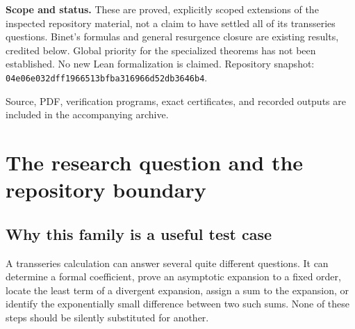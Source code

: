 \documentclass[11pt,a4paper]{article}
\theoremstyle{definition}
\numberwithin{equation}{section}
\newcommand{\ee}{\mathrm{e}}
\newcommand{\Oh}{\mathcal O}
\begin{document}
\begin{titlepage}
\begin{abstract}
An exact Fermi--Dirac integral yields signed forward remainders and rationally checkable inverse enclosures. If $u_M$ is the local inverse of the forward expansion truncated after $M$ terms, and $M-\pi X$ stays bounded, we prove the sharp law
$u_M-W(X)=(-1)^M\sqrt X\,\ee^{-2\pi X}(1+\Oh(X^{-1}))$, including its first correction and an all-orders construction. The exact Borel kernel also determines the forward Stokes jump. Transporting that jump through inversion gives an explicit convergent expansion of every inverse exponential sector. Known nonlinear resurgence theorems identify the formal inverse as a Borel-summable resurgent series. Exact symbolic checks, 190-digit experiments, and independent exact-rational enclosure checks accompany the proofs.
\end{abstract}
\vspace{4mm}
\noindent\textbf{Scope and status.} These are proved, explicitly scoped extensions of the inspected repository material, not a claim to have settled all of its transseries questions. Binet's formulas and general resurgence closure are existing results, credited below. Global priority for the specialized theorems has not been established. No new Lean formalization is claimed.
\vfill
\noindent\small Repository snapshot: \texttt{04e06e032dff1966513bfba316966d52db3646b4}.\par
\noindent\small Source, PDF, verification programs, exact certificates, and recorded outputs are included in the accompanying archive.
\end{titlepage}
\hypersetup{pageanchor=true}
\begingroup
\small
\setlength{\parskip}{0pt}
\tableofcontents
\endgroup
\newpage

\section{The research question and the repository boundary}
\label{sec:scope}

\subsection{Why this family is a useful test case}
A transseries calculation can answer several quite different questions. It can determine a formal coefficient, prove an asymptotic expansion to a fixed order, locate the least term of a divergent expansion, assign a sum to the expansion, or identify the exponentially small difference between two such sums. None of these steps should be silently substituted for another.
\end{document}

